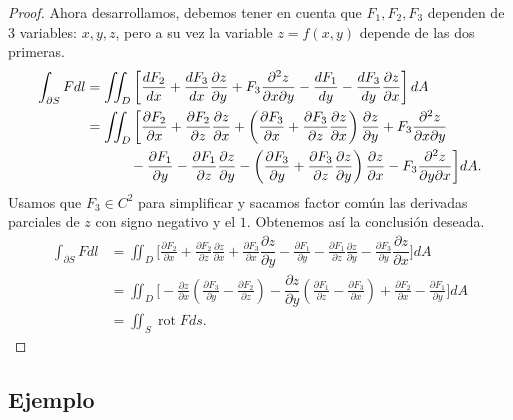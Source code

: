 \documentclass[12pt,spanish]{article}
\theoremstyle{definition}
\theoremstyle{remark}
\begin{document}
\begin{proof}
	Ahora desarrollamos, debemos tener en cuenta que $F_1,F_2,F_3$ dependen de 3 variables: $x,y,z$, pero a su vez la variable $z=f(x,y)$ depende de las dos primeras.
	\begin{align*}
	\int_{\partial S} F dl&=\iint_D\left[\frac{d F_2}{d x}+\frac{d F_3}{d x}\dfrac{\partial z}{\partial y}+F_3\frac{\partial^2 z}{\partial x\partial y}-\frac{d F_1}{d y}-\frac{d F_3}{d y}\dfrac{\partial z}{\partial x}\right]dA \\
	&=\iint_D\bigg[\frac{\partial F_2}{\partial x}+\frac{\partial F_2}{\partial z}\frac{\partial z}{\partial x}+\left(\frac{\partial F_3}{\partial x}+\frac{\partial F_3}{\partial z}\frac{\partial z}{\partial x}\right)\dfrac{\partial z}{\partial y}+F_3\frac{\partial^2 z}{\partial x\partial y} \\
	 &~\hspace{10mm}-\frac{\partial F_1}{\partial y}-\frac{\partial F_1}{\partial z}\frac{\partial z}{\partial y}-\left(\frac{\partial F_3}{\partial y}+\frac{\partial F_3}{\partial z}\frac{\partial z}{\partial y}\right)\dfrac{\partial z}{\partial x}-F_3\frac{\partial^2 z}{\partial y\partial x}\bigg]dA.
	\end{align*}
	Usamos que $F_3\in C^2$ para simplificar y sacamos factor común las derivadas parciales de $z$ con signo negativo y el $1$. Obtenemos así la conclusión deseada.
		\begin{align*}
	\int_{\partial S} F dl&=\iint_D\bigg[\frac{\partial F_2}{\partial x}+\frac{\partial F_2}{\partial z}\frac{\partial z}{\partial x}+\frac{\partial F_3}{\partial x}\dfrac{\partial z}{\partial y}-\frac{\partial F_1}{\partial y}-\frac{\partial F_1}{\partial z}\frac{\partial z}{\partial y}-\frac{\partial F_3}{\partial y}\dfrac{\partial z}{\partial x}\bigg]dA \\
	&=\iint_D\bigg[-\frac{\partial z}{\partial x}\left(\frac{\partial F_3}{\partial y}-\frac{\partial F_2}{\partial z}\right)-\dfrac{\partial z}{\partial y}\left(\frac{\partial F_1}{\partial z}-\frac{\partial F_3}{\partial x}\right)+\frac{\partial F_2}{\partial x}-\frac{\partial F_1}{\partial y}\bigg]dA\\
	&=\iint_S \operatorname{rot}F ds.
	\end{align*}
	
\end{proof}

\subsection*{Ejemplo}
\end{document}
